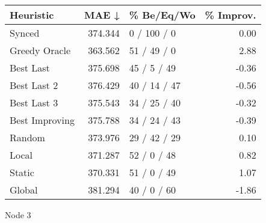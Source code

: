 \begin{tabular}{lrlr}
\toprule
\textbf{Heuristic} & \textbf{MAE ↓} & \textbf{\% Be/Eq/Wo} & \textbf{\% Improv.} \\
\midrule
            Synced &        374.344 &          0 / 100 / 0 &                0.00 \\
     Greedy Oracle &        363.562 &          51 / 49 / 0 &                2.88 \\
         Best Last &        375.698 &          45 / 5 / 49 &               -0.36 \\
       Best Last 2 &        376.429 &         40 / 14 / 47 &               -0.56 \\
       Best Last 3 &        375.543 &         34 / 25 / 40 &               -0.32 \\
    Best Improving &        375.788 &         34 / 24 / 43 &               -0.39 \\
            Random &        373.976 &         29 / 42 / 29 &                0.10 \\
             Local &        371.287 &          52 / 0 / 48 &                0.82 \\
            Static &        370.331 &          51 / 0 / 49 &                1.07 \\
            Global &        381.294 &          40 / 0 / 60 &               -1.86 \\
\bottomrule
\end{tabular}
\caption{Node 3}
\label{tab:non_lr05_le2_bs2_3}
